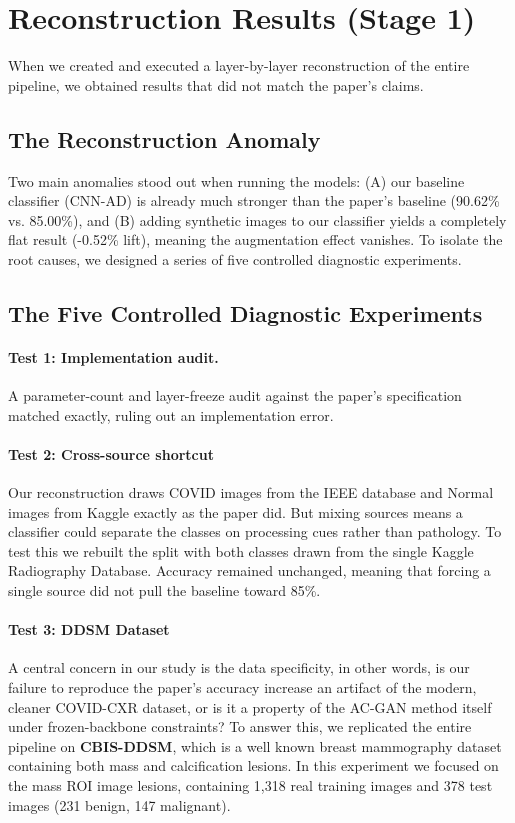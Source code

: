 \documentclass[11pt]{article}
\begin{document}
\section{Reconstruction Results (Stage 1)} \label{sec:reconstruction_results}
When we created and executed a layer-by-layer reconstruction of the entire pipeline, we obtained results that did not match the paper's claims. 

\subsection{The Reconstruction Anomaly}
Two main anomalies stood out when running the models: (A) our baseline classifier (CNN-AD) is already much stronger than the paper's baseline (90.62\% vs. 85.00\%), and (B) adding synthetic images to our classifier yields a completely flat result (-0.52\% lift), meaning the augmentation effect vanishes. To isolate the root causes, we designed a series of five controlled diagnostic experiments.

\subsection{The Five Controlled Diagnostic Experiments}

\paragraph{Test 1: Implementation audit.} A parameter-count and layer-freeze audit against the paper's specification matched exactly, ruling out an implementation error.

\paragraph{Test 2: Cross-source shortcut }
Our reconstruction draws COVID images from the IEEE database and Normal images from Kaggle exactly as the paper did. But mixing sources means a classifier could separate the classes on processing cues rather than pathology. To test this we rebuilt the split with both classes drawn from the single Kaggle Radiography Database. Accuracy remained unchanged, meaning that forcing a single source did not pull the baseline toward 85\%.

\paragraph{Test 3: DDSM Dataset} A central concern in our study is the data specificity, in other words, is our failure to reproduce the paper's accuracy increase an artifact of the modern, cleaner COVID-CXR dataset, or is it a property of the AC-GAN method itself under frozen-backbone constraints? To answer this, we
replicated the entire pipeline on \textbf{CBIS-DDSM}, which is a well known breast mammography dataset containing both mass and calcification lesions. In this experiment we focused on the mass ROI image lesions, containing 1,318 real training images and 378 test images (231 benign, 147 malignant).
\end{document}
